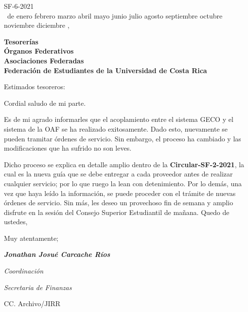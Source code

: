 \documentclass[12pt]{article}
\newcommand{\MONTH}{%
  \ifcase\the\month
  \or enero%
  \or febrero%
  \or marzo%
  \or abril%
  \or mayo%
  \or junio%
  \or julio%
  \or agosto%
  \or septiembre%
  \or octubre%
  \or noviembre%
  \or diciembre%
  \fi}
\begin{document}
\begin{flushright}
  SF-6-2021\\
  \medskip
  \the\day\ de \MONTH, \the\year
\end{flushright}
\medskip
\begin{flushleft}\begin{spacing}{1}
  \textbf{Tesorerías\\
  Órganos Federativos\\
  Asociaciones Federadas\\
  Federación de Estudiantes de la Universidad de Costa Rica}
\end{spacing}\end{flushleft}

\noindent Estimados tesoreros:\par
Cordial saludo de mi parte.\par
Es de mi agrado informarles que el acoplamiento entre el sistema GECO y el sistema de la OAF se ha realizado exitosamente. Dado esto, nuevamente se pueden tramitar órdenes de servicio. Sin embargo, el proceso ha cambiado y las modificaciones que ha sufrido no son leves.\par 
Dicho proceso se explica en detalle amplio dentro de la \textbf{Circular-SF-2-2021}, la cual es la nueva guía que se debe entregar a cada proveedor antes de realizar cualquier servicio; por lo que ruego la lean con detenimiento. Por lo demás, una vez que haya leído la información, se puede proceder con el trámite de nuevas órdenes de servicio.
Sin más, les deseo un provechoso fin de semana y amplio disfrute en la sesión del Consejo Superior Estudiantil de mañana. Quedo de ustedes,\par
Muy atentamente;\par
\bigskip
\bigskip
\bigskip
\begin{spacing}{1}
\textit{\textbf{Jonathan Josué Carcache Ríos}}\par
\textit{Coordinación}\par 
\textit{Secretaria de Finanzas}
\end{spacing}
\medskip
\begin{flushleft}\begin{spacing}{1}
 \scriptsize{CC. Archivo/JIRR

 }
\end{spacing}\end{flushleft}
%
%
\end{document}
